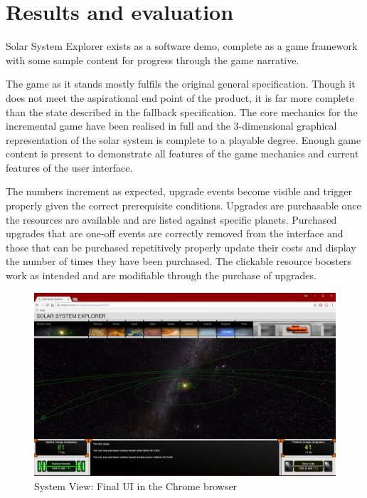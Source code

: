 \documentclass[twoside]{bhamthesis}
\begin{document}
\section{Results and evaluation}

Solar System Explorer exists as a software demo, complete as a game framework with some sample content for progress through the game narrative.



The game as it stands mostly fulfils the original general specification. Though it does not meet the aspirational end point of the product, it is far more complete than the state described in the fallback specification. The core mechanics for the incremental game have been realised in full and the 3-dimensional graphical representation of the solar system is complete to a playable degree. Enough game content is present to demonstrate all features of the game mechanics and current features of the user interface.

The numbers increment as expected, upgrade events become visible and trigger properly given the correct prerequisite conditions. Upgrades are purchasable once the resources are available and are listed against specific planets. Purchased upgrades that are one-off events are correctly removed from the interface and those that can be purchased repetitively properly update their costs and display the number of times they have been purchased. The clickable resource boosters work as intended and are modifiable through the purchase of upgrades.

\begin{figure}[h!]
  \includegraphics[width=\linewidth]{images/system_view.jpg}
  \caption{System View: Final UI in the Chrome browser}
  \label{fig:system_view}
\end{figure}
\end{document}

